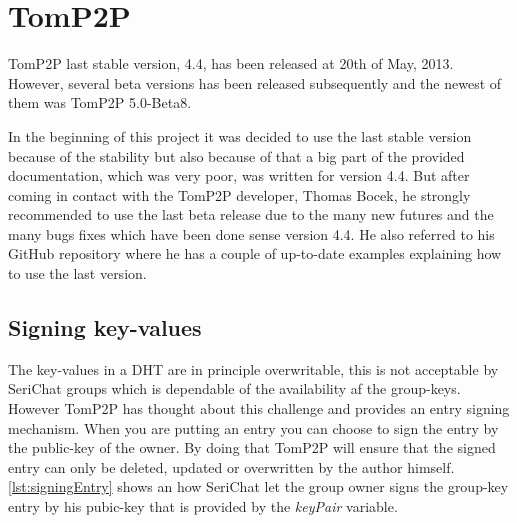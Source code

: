 \begin{figure}[bth]
\end{figure}
\section{TomP2P}
TomP2P last stable version, 4.4, has been released at 20th of May, 2013. However, several beta versions has been released subsequently and the newest of them was TomP2P 5.0-Beta8.

In the beginning of this project it was decided to use the last stable version because of the stability but also because of that a big part of the provided documentation, which was very poor, was written for version 4.4. But after coming in contact with the TomP2P developer, Thomas Bocek, he strongly recommended to use the last beta release due to the many new futures and the many bugs fixes which have been done sense version 4.4. He also referred to his GitHub repository where he has a couple of up-to-date examples explaining how to use the last version.

\subsection{Signing key-values}
The key-values in a DHT are in principle overwritable, this is not acceptable by SeriChat groups which is dependable of the availability af the group-keys. However TomP2P has thought about this challenge and provides an entry signing mechanism. When you are putting an entry you can choose to sign the entry by the public-key of the owner. By doing that TomP2P will ensure that the signed entry can only be deleted, updated or overwritten by the author himself. \autoref{lst:signingEntry} shows an how SeriChat let the group owner signs the group-key entry by his pubic-key that is provided by the \textit{keyPair } variable.

